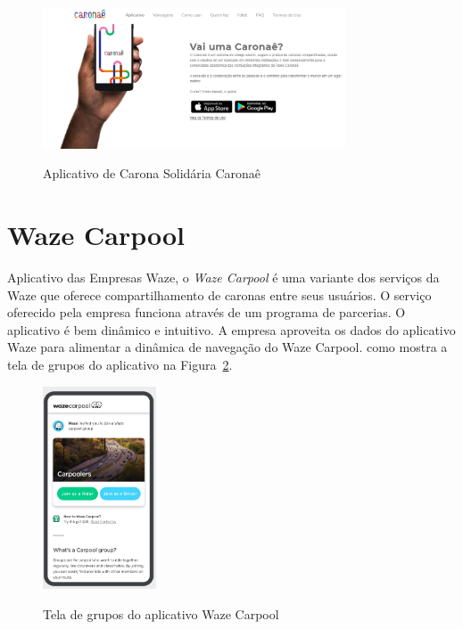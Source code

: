 \begin{figure}[!hbtp]
	\centering
	\caption{Aplicativo de Carona Solidária Caronaê}
	\includegraphics[width=0.8\textwidth]{./04-figuras/caronae.png}
	\label{fig:caronae}
\end{figure}

\section{Waze Carpool}
Aplicativo das Empresas Waze, o \textit{Waze Carpool} é uma variante dos serviços da Waze que oferece compartilhamento de caronas entre seus usuários. O serviço oferecido pela empresa funciona através de um programa de parcerias. O aplicativo é bem dinâmico e intuitivo. A empresa aproveita os dados do aplicativo Waze para alimentar a dinâmica de navegação do Waze Carpool. como mostra a tela de grupos do aplicativo na Figura~\ref{fig:tela_grupos_wazecarpool}.

\begin{figure}[!hbtp]
	\centering
	\caption{Tela de grupos do aplicativo Waze Carpool}
	\includegraphics[width=0.3\textwidth]{./04-figuras/waze/Tela_de_grupos.png}
	\label{fig:tela_grupos_wazecarpool}
\end{figure}

